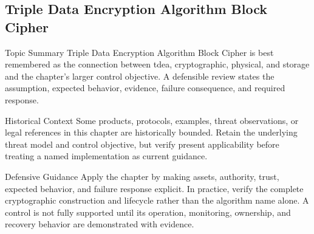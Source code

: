 \documentclass[11pt,letterpaper]{article}
\begin{document}
\subsection*{Triple Data Encryption Algorithm Block Cipher}
\begin{CornellNotesTable}
\end{CornellNotesTable}
\begin{CornellSummaryBox}{Topic Summary}
Triple Data Encryption Algorithm Block Cipher is best remembered as the connection between tdea, cryptographic, physical, and storage and the chapter's larger control objective. A defensible review states the assumption, expected behavior, evidence, failure consequence, and required response.
\end{CornellSummaryBox}
\begin{CornellWarningBox}{Historical Context}
Some products, protocols, examples, threat observations, or legal references in this chapter are historically bounded. Retain the underlying threat model and control objective, but verify present applicability before treating a named implementation as current guidance.
\end{CornellWarningBox}
\begin{CornellOverviewBox}{Defensive Guidance}
Apply the chapter by making assets, authority, trust, expected behavior, and failure response explicit. In practice, verify the complete cryptographic construction and lifecycle rather than the algorithm name alone. A control is not fully supported until its operation, monitoring, ownership, and recovery behavior are demonstrated with evidence.
\end{CornellOverviewBox}
\end{document}

